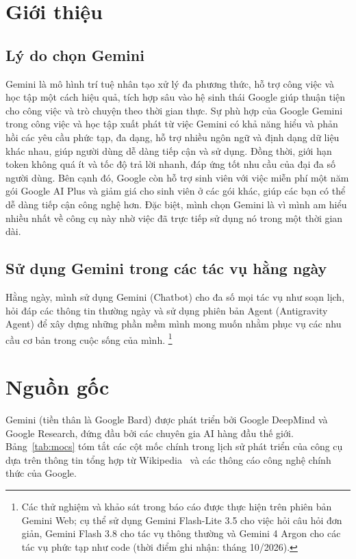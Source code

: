 \documentclass[12pt,a4paper]{article}
\begin{document}
\section{Giới thiệu}
\subsection{Lý do chọn Gemini}
Gemini là mô hình trí tuệ nhân tạo xử lý đa phương thức, hỗ trợ công việc và học tập một cách hiệu quả, tích hợp sâu vào hệ sinh thái Google giúp thuận tiện cho công việc và trò chuyện theo thời gian thực.
Sự phù hợp của Google Gemini trong công việc và học tập xuất phát từ việc Gemini có khả năng hiểu và phản hồi các yêu cầu phức tạp, đa dạng, hỗ trợ nhiều ngôn ngữ và định dạng dữ liệu khác nhau, giúp người dùng dễ dàng tiếp cận và sử dụng. Đồng thời, giới hạn token không quá ít và tốc độ trả lời nhanh, đáp ứng tốt nhu cầu của đại đa số người dùng.
Bên cạnh đó, Google còn hỗ trợ sinh viên với việc miễn phí một năm gói Google AI Plus và giảm giá cho sinh viên ở các gói khác, giúp các bạn có thể dễ dàng tiếp cận công nghệ hơn.
Đặc biệt, mình chọn Gemini là vì mình am hiểu nhiều nhất về công cụ này nhờ việc đã trực tiếp sử dụng nó trong một thời gian dài.

\subsection{Sử dụng Gemini trong các tác vụ hằng ngày}
Hằng ngày, mình sử dụng Gemini (Chatbot) cho đa số mọi tác vụ như soạn lịch, hỏi đáp các thông tin thường ngày và sử dụng phiên bản Agent (Antigravity Agent) để xây dựng những phần mềm mình mong muốn nhằm phục vụ các nhu cầu cơ bản trong cuộc sống của mình.%
\footnote{Các thử nghiệm và khảo sát trong báo cáo được thực hiện trên phiên bản Gemini Web; cụ thể sử dụng Gemini Flash-Lite 3.5 cho việc hỏi câu hỏi đơn giản, Gemini Flash 3.8 cho tác vụ thông thường và Gemini 4 Argon cho các tác vụ phức tạp như code (thời điểm ghi nhận: tháng 10/2026).}

\section{Nguồn gốc}
Gemini (tiền thân là Google Bard) được phát triển bởi Google DeepMind và Google Research, đứng đầu bởi các chuyên gia AI hàng đầu thế giới. Bảng~\ref{tab:mocs} tóm tắt các cột mốc chính trong lịch sử phát triển của công cụ dựa trên thông tin tổng hợp từ Wikipedia~\cite{wiki-gemini} và các thông cáo công nghệ chính thức của Google.
\end{document}
